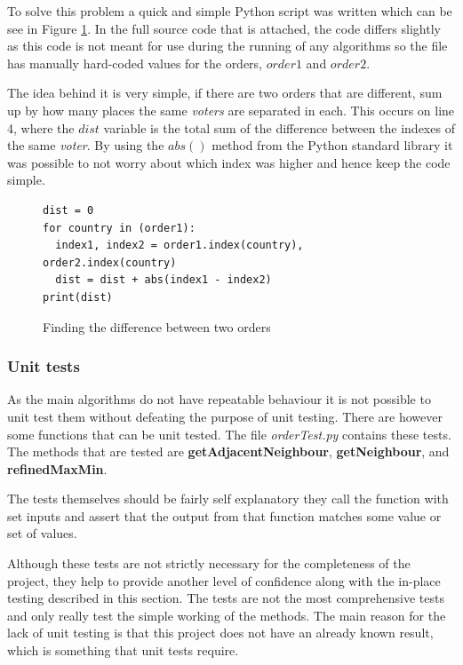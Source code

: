 \documentclass[12pt]{report}
\begin{document}
To solve this problem a quick and simple Python script was written which can be see in Figure \ref{orderDiff}. In the full source code that is attached, the code differs slightly as this code is not meant for use during the running of any algorithms so the file has manually hard-coded values for the orders, $order1$ and $order2$.

The idea behind it is very simple, if there are two orders that are different, sum up by how many places the same \textit{voters} are separated in each. This occurs on line 4, where the $dist$ variable is the total sum of the difference between the indexes of the same \textit{voter}. By using the $abs()$ method from the Python standard library it was possible to not worry about which index was higher and hence keep the code simple.

\begin{figure}[H]
\caption{Finding the difference between two orders}
\label{orderDiff}
\begin{lstlisting}
dist = 0
for country in (order1):
  index1, index2 = order1.index(country), order2.index(country)
  dist = dist + abs(index1 - index2)
print(dist)
\end{lstlisting}
\end{figure}

\subsubsection{Unit tests}
As the main algorithms do not have repeatable behaviour it is not possible to unit test them without defeating the purpose of unit testing. There are however some functions that can be unit tested. The file \textit{orderTest.py} contains these tests. The methods that are tested are \textbf{getAdjacentNeighbour}, \textbf{getNeighbour}, and \textbf{refinedMaxMin}.

The tests themselves should be fairly self explanatory they call the function with set inputs and assert that the output from that function matches some value or set of values.

Although these tests are not strictly necessary for the completeness of the project, they help to provide another level of confidence along with the in-place testing described in this section. The tests are not the most comprehensive tests and only really test the simple working of the methods. The main reason for the lack of unit testing is that this project does not have an already known result, which is something that unit tests require. 
\end{document}
